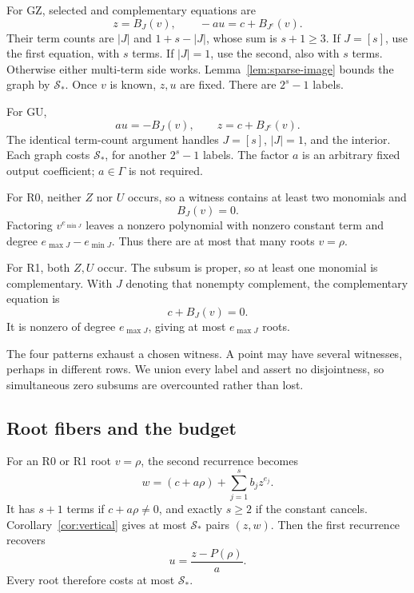 \documentclass[11pt]{article}
\theoremstyle{definition}
\newcommand{\Scal}{\mathcal S}
\begin{document}
For GZ, selected and complementary equations are
\begin{equation}
 z=B_J(v),\qquad -au=c+B_{J^c}(v).
 \label{eq:GZ}
\end{equation}
Their term counts are \(|J|\) and \(1+s-|J|\), whose sum is \(s+1\geq3\). If \(J=[s]\), use the first equation, with \(s\) terms. If \(|J|=1\), use the second, also with \(s\) terms. Otherwise either multi-term side works. Lemma~\ref{lem:sparse-image} bounds the graph by \(\Scal_*\). Once \(v\) is known, \(z,u\) are fixed. There are \(2^s-1\) labels.

For GU,
\begin{equation}
 au=-B_J(v),\qquad z=c+B_{J^c}(v).
 \label{eq:GU}
\end{equation}
The identical term-count argument handles \(J=[s]\), \(|J|=1\), and the interior. Each graph costs \(\Scal_*\), for another \(2^s-1\) labels. The factor \(a\) is an arbitrary fixed output coefficient; \(a\in\Gamma\) is not required.

For R0, neither \(Z\) nor \(U\) occurs, so a witness contains at least two monomials and
\begin{equation}
 B_J(v)=0.
 \label{eq:R0}
\end{equation}
Factoring \(v^{e_{\min J}}\) leaves a nonzero polynomial with nonzero constant term and degree \(e_{\max J}-e_{\min J}\). Thus there are at most that many roots \(v=\rho\).

For R1, both \(Z,U\) occur. The subsum is proper, so at least one monomial is complementary. With \(J\) denoting that nonempty complement, the complementary equation is
\begin{equation}
 c+B_J(v)=0.
 \label{eq:R1}
\end{equation}
It is nonzero of degree \(e_{\max J}\), giving at most \(e_{\max J}\) roots.

The four patterns exhaust a chosen witness. A point may have several witnesses, perhaps in different rows. We union every label and assert no disjointness, so simultaneous zero subsums are overcounted rather than lost.

\subsection{Root fibers and the budget}

For an R0 or R1 root \(v=\rho\), the second recurrence becomes
\begin{equation}
 w=(c+a\rho)+\sum_{j=1}^{s}b_jz^{e_j}.
 \label{eq:vertical-step}
\end{equation}
It has \(s+1\) terms if \(c+a\rho\neq0\), and exactly \(s\geq2\) if the constant cancels. Corollary~\ref{cor:vertical} gives at most \(\Scal_*\) pairs \((z,w)\). Then the first recurrence recovers
\begin{equation}
 u=\frac{z-P(\rho)}a.
 \label{eq:u-recovery}
\end{equation}
Every root therefore costs at most \(\Scal_*\).
\end{document}
